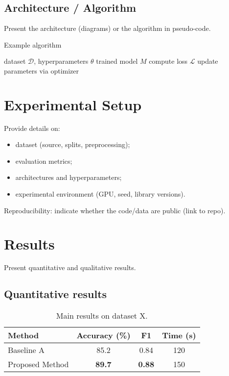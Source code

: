 \documentclass[10pt,twocolumn]{article}
\theoremstyle{definition}
\theoremstyle{plain}
\begin{document}
\subsection{Architecture / Algorithm}
Present the architecture (diagrams) or the algorithm in pseudo-code.

\begin{algorithm}[H]
  \caption{Example algorithm}
  \begin{algorithmic}[1]
    \REQUIRE dataset $\mathcal{D}$, hyperparameters $\theta$
    \ENSURE trained model $M$
        \STATE compute loss $\mathcal{L}$
        \STATE update parameters via optimizer
      \ENDFOR
    \ENDFOR
  \end{algorithmic}
\end{algorithm}

\section{Experimental Setup}
Provide details on:
\begin{itemize}[noitemsep]
  \item dataset (source, splits, preprocessing);
  \item evaluation metrics;
  \item architectures and hyperparameters;
  \item experimental environment (GPU, seed, library versions).
\end{itemize}
Reproducibility: indicate whether the code/data are public (link to repo).

\section{Results}
Present quantitative and qualitative results.

\subsection{Quantitative results}
\begin{table}[H]
  \centering
  \caption{Main results on dataset X.}
  \begin{tabular}{lccc}
    \toprule
    Method & Accuracy (\%) & F1 & Time (s) \\
    \midrule
    Baseline A & 85.2 & 0.84 & 120 \\
    Proposed Method & \textbf{89.7} & \textbf{0.88} & 150 \\
    \bottomrule
  \end{tabular}
\end{table}
\end{document}
